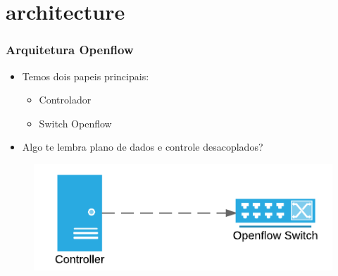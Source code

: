 \section{architecture}


%
%
\begin{frame}\frametitle{Arquitetura Openflow}

    \begin{itemize}
    \item Temos dois papeis principais:
        \begin{itemize}
        \item Controlador
        \item Switch Openflow
        \end{itemize}
    \item Algo te lembra plano de dados e controle desacoplados?
    \end{itemize}
    
	\begin{figure}[h]
        \centering
        \includegraphics[scale=0.6]{images/controller-to-openflow.png}
    \end{figure}
\end{frame}




